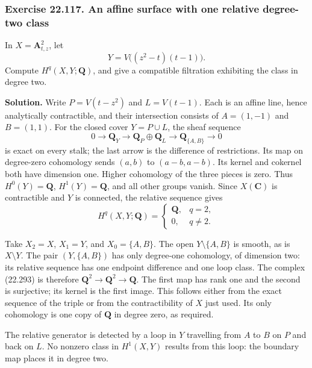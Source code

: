 \documentclass[
  11pt,
  a4paper,
]{article}
\begin{document}
\subsubsection{Exercise 22.117. An affine surface with one relative
degree-two
class}\label{exercise-22.117.-an-affine-surface-with-one-relative-degree-two-class}

In \(X=\mathbf A^2_{t,z}\), let \[
 Y=V\bigl((z^2-t)(t-1)\bigr).
 \tag{22.298}
\] Compute \(H^q(X,Y;\mathbf Q)\), and give a compatible filtration
exhibiting the class in degree two.

\textbf{Solution.} Write \(P=V(t-z^2)\) and \(L=V(t-1)\). Each is an
affine line, hence analytically contractible, and their intersection
consists of \(A=(1,-1)\) and \(B=(1,1)\). For the closed cover
\(Y=P\cup L\), the sheaf sequence \[
 0\longrightarrow\mathbf Q_Y
 \longrightarrow\mathbf Q_P\oplus\mathbf Q_L
 \longrightarrow\mathbf Q_{\{A,B\}}\longrightarrow0
 \tag{22.299}
\] is exact on every stalk; the last arrow is the difference of
restrictions. Its map on degree-zero cohomology sends \((a,b)\) to
\((a-b,a-b)\). Its kernel and cokernel both have dimension one. Higher
cohomology of the three pieces is zero. Thus \(H^0(Y)=\mathbf Q\),
\(H^1(Y)=\mathbf Q\), and all other groups vanish. Since
\(X(\mathbf C)\) is contractible and \(Y\) is connected, the relative
sequence gives \[
 H^q(X,Y;\mathbf Q)=
 \begin{cases}\mathbf Q,&q=2,\\0,&q\ne2.\end{cases}
 \tag{22.300}
\]

Take \(X_2=X\), \(X_1=Y\), and \(X_0=\{A,B\}\). The open
\(Y\setminus\{A,B\}\) is smooth, as is \(X\setminus Y\). The pair
\((Y,\{A,B\})\) has only degree-one cohomology, of dimension two: its
relative sequence has one endpoint difference and one loop class. The
complex (22.293) is therefore \(\mathbf Q^2\to\mathbf Q^2\to\mathbf Q\).
The first map has rank one and the second is surjective; its kernel is
the first image. This follows either from the exact sequence of the
triple or from the contractibility of \(X\) just used. Its only
cohomology is one copy of \(\mathbf Q\) in degree zero, as required.

The relative generator is detected by a loop in \(Y\) travelling from
\(A\) to \(B\) on \(P\) and back on \(L\). No nonzero class in
\(H^1(X,Y)\) results from this loop: the boundary map places it in
degree two.
\end{document}

